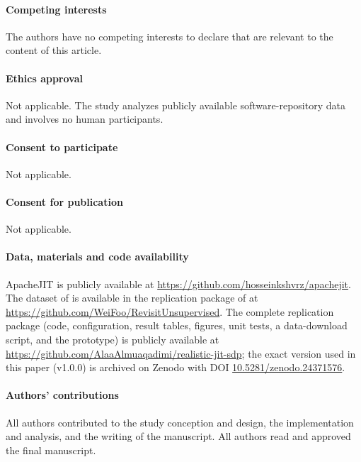 \documentclass[11pt,a4paper]{article}
\begin{document}
\paragraph{Competing interests} The authors have no competing interests to declare that are relevant to the content of this article.

\paragraph{Ethics approval} Not applicable. The study analyzes publicly available software-repository data and involves no human participants.

\paragraph{Consent to participate} Not applicable.

\paragraph{Consent for publication} Not applicable.

\paragraph{Data, materials and code availability} ApacheJIT is publicly available at \url{https://github.com/hosseinkshvrz/apachejit}. The dataset of \citet{kamei2013} is available in the replication package of \citet{fu2017} at \url{https://github.com/WeiFoo/RevisitUnsupervised}. The complete replication package (code, configuration, result tables, figures, unit tests, a data-download script, and the prototype) is publicly available at \url{https://github.com/AlaaAlmuaqadimi/realistic-jit-sdp}; the exact version used in this paper (v1.0.0) is archived on Zenodo with DOI \href{https://doi.org/10.5281/zenodo.24371576}{10.5281/zenodo.24371576}.

\paragraph{Authors' contributions} All authors contributed to the study conception and design, the implementation and analysis, and the writing of the manuscript. All authors read and approved the final manuscript.



\end{document}
